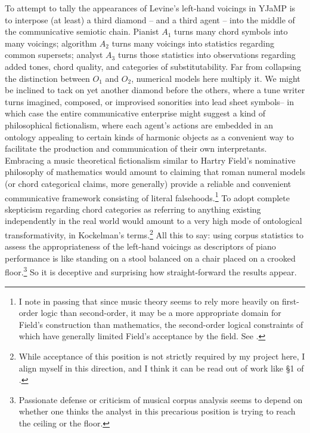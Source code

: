 To attempt to tally the appearances of Levine's left-hand voicings in YJaMP is to interpose (at least) a third diamond -- and a third agent -- into the middle of the communicative semiotic chain.  Pianist $A_1$ turns many chord symbols into many voicings; algorithm $A_2$ turns many voicings into statistics regarding common supersets; analyst $A_3$ turns those statistics into observations regarding added tones, chord quality, and categories of substitutability.  Far from collapsing the distinction between $O_1$ and $O_2$, numerical models here multiply it.  We might be inclined to tack on yet another diamond before the others, where a tune writer turns imagined, composed, or improvised sonorities into lead sheet symbols-- in which case the entire communicative enterprise might suggest a kind of philosophical fictionalism, where each agent's actions are embedded in an ontology appealing to certain kinds of harmonic objects as a convenient way to facilitate the production and communication of their own interpretants.  Embracing a music theoretical fictionalism similar to Hartry Field's nominative philosophy of mathematics would amount to claiming that roman numeral models (or chord categorical claims, more generally) provide a reliable and convenient communicative framework consisting of literal falsehoods.\footnote{I note in passing that since music theory seems to rely more heavily on first-order logic than second-order, it may be a more appropriate domain for Field's construction than mathematics, the second-order logical constraints of which have generally limited Field's acceptance by the field.  See \cite{field1980}.}  To adopt complete skepticism regarding chord categories as referring to anything existing independently in the real world would amount to a very high mode of ontological transformativity, in Kockelman's terms.\footnote{While acceptance of this position is not strictly required by my project here, I align myself in this direction, and I think it can be read out of work like \S 1 of \cite{quinn2017}.}  All this to say: using corpus statistics to assess the appropriateness of the left-hand voicings as descriptors of piano performance is like standing on a stool balanced on a chair placed on a crooked floor.\footnote{Passionate defense or criticism of musical corpus analysis seems to depend on whether one thinks the analyst in this precarious position is trying to reach the ceiling or the floor.}  So it is deceptive and surprising how straight-forward the results appear.


